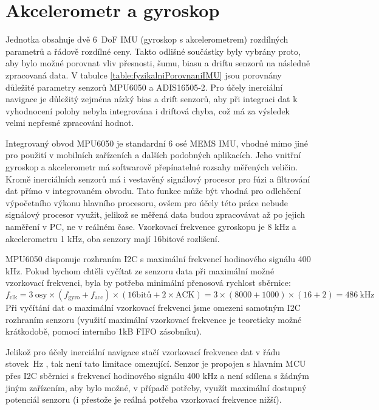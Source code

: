 \section{Akcelerometr a gyroskop} \label{AccGyroText}
Jednotka obsahuje dvě 6~\ac{DoF} \ac{IMU} (gyroskop s akcelerometrem) rozdílných parametrů a řádově rozdílné ceny. Takto odlišné součástky byly vybrány proto, aby bylo možné porovnat vliv přesnosti, šumu, biasu a driftu senzorů na následně zpracovaná data.
V tabulce \ref{table:fyzikalniPorovnaniIMU} jsou porovnány důležité parametry senzorů MPU6050 a ADIS16505-2. Pro účely inerciální navigace je důležitý zejména nízký bias a drift senzorů, aby při integraci dat k vyhodnocení polohy nebyla integrována i driftová chyba, což má za výsledek velmi nepřesné zpracování hodnot. \cite{Blocher2021322}



Integrovaný obvod MPU6050 je standardní 6 osé \ac{MEMS} \ac{IMU}, vhodné mimo jiné pro použití v mobilních zařízeních a dalších podobných aplikacích. Jeho vnitřní gyroskop a akcelerometr má softwarově přepínatelné rozsahy měřených veličin. Kromě inerciálních senzorů má i vestavěný signálový procesor pro fúzi a filtrování dat přímo v integrovaném obvodu. Tato funkce může být vhodná pro odlehčení výpočetního výkonu hlavního procesoru, ovšem pro účely této práce nebude signálový procesor využit, jelikož se měřená data budou zpracovávat až po jejich naměření v PC, ne v reálném čase. Vzorkovací frekvence gyroskopu je 8 kHz a akcelerometru 1 kHz, oba senzory mají 16bitové rozlišení.
\cite{euxR3Yh5ol4JWNAi}

MPU6050 disponuje rozhraním \ac{I2C} s maximální frekvencí hodinového signálu 400 kHz. \cite{euxR3Yh5ol4JWNAi}
Pokud bychom chtěli vyčítat ze senzoru data při maximální možné vzorkovací frekvenci, byla by potřeba minimální přenosová rychlost sběrnice:
\begin{equation}
f_{\mathrm{clk}}=3~\mathrm{osy} \times(f_{\mathrm{gyro}} + f_{\mathrm{acc}})\times (\mathrm{16bitů} + 2 \times \mathrm{ACK})=3\times(8000+1000)\times(16+2)=\SI{486}{\kilo\hertz}
\end{equation}
Při vyčítání dat o maximální vzorkovací frekvenci jsme omezeni samotným \ac{I2C} rozhraním senzoru (využití maximální vzorkovací frekvence je teoreticky možné krátkodobě, pomocí interního 1kB FIFO zásobníku).\cite{euxR3Yh5ol4JWNAi}

Jelikož pro účely inerciální navigace stačí vzorkovací frekvence dat v  řádu stovek~Hz \cite{Wei2022}, tak není tato limitace omezující. Senzor je propojen s hlavním \ac{MCU} přes \ac{I2C} sběrnici s frekvencí hodinového signálu 400 kHz a není sdílena s žádným jiným zařízením, aby bylo možné, v případě potřeby, využít maximální dostupný potenciál senzoru (i přestože je reálná potřeba vzorkovací frekvence nižší).

